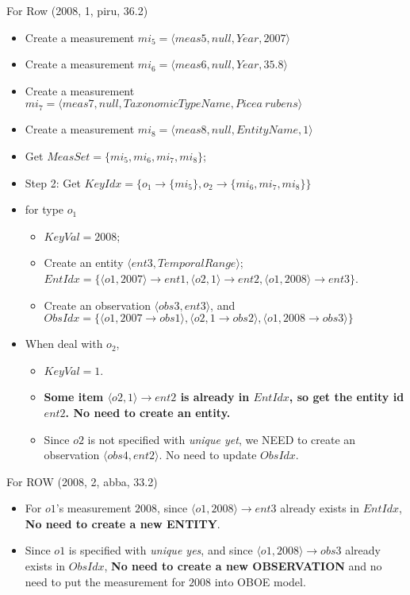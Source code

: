 \documentclass[10pt]{article}
\begin{document}
For Row (2008, 1, piru, 36.2)
    \begin{itemize}
    \item Create a measurement $mi_5=\langle meas5, null, Year, 2007\rangle$
    \item Create a measurement $mi_6=\langle meas6, null, Year, 35.8\rangle$
    \item Create a measurement $mi_7=\langle meas7, null, TaxonomicTypeName, Picea~rubens\rangle$
    \item Create a measurement $mi_8=\langle meas8, null, EntityName, 1\rangle$
    \item Get $MeasSet = \{mi_5, mi_6, mi_7, mi_8\}$;
    \item Step 2: Get $KeyIdx = \{o_1\rightarrow \{mi_5\}, o_2 \rightarrow \{mi_6, mi_7, mi_8\}\}$
    \item for type $o_1$
    \begin{itemize}
        \item  $KeyVal=2008$;
        \item Create an entity $\langle ent3, TemporalRange\rangle$; $EntIdx=\{\langle o1, 2007 \rangle \rightarrow ent1, \langle o2, 1 \rangle \rightarrow ent2, \langle o1, 2008 \rangle \rightarrow ent3\}$.
         \item Create an observation $\langle obs3, ent3 \rangle$, and $ObsIdx=\{\langle o1, 2007\rightarrow obs1\rangle, \langle o2, 1\rightarrow obs2\rangle, \langle o1, 2008\rightarrow obs3\rangle\}$
    \end{itemize}
    \item When deal with $o_2$,
        \begin{itemize}
         \item $KeyVal=1$.
        \item {\bf Some item $\langle o2, 1 \rangle \rightarrow ent2$ is already in $EntIdx$, so get the entity id $ent2$. No need to create an entity.}
        \item Since $o2$ is not specified with {\em unique yet}, we NEED to create an observation $\langle obs4, ent2 \rangle$. No need to update $ObsIdx$.
        \end{itemize}
    \end{itemize}
For ROW (2008, 2, abba, 33.2)
    \begin{itemize}
        \item For $o1$'s measurement $2008$, since $\langle o1, 2008 \rangle \rightarrow ent3$ already exists in $EntIdx$, {\bf No need to create a new ENTITY}.
        \item Since $o1$ is specified with {\em unique yes}, and since $\langle o1, 2008 \rangle \rightarrow obs3 $ already exists in $ObsIdx$, {\bf No need to create a new OBSERVATION} and no need to put the measurement for $2008$ into OBOE model.
    \end{itemize}
\end{document}
